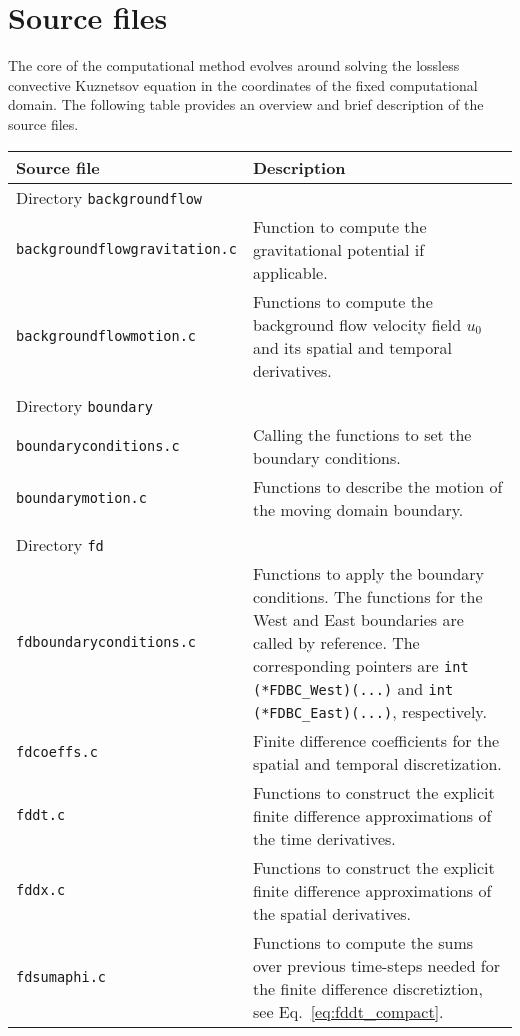\section{Source files}
\label{sec:Source files}

The core of the computational method evolves around solving the lossless convective Kuznetsov equation \citep{Schenke_et_al_2023_JASA} in the coordinates of the fixed computational domain. The following table provides an overview and brief description of the source files.

\noindent
\begin{longtable}{p{} p{}}
\textbf{Source file} & \textbf{Description}
\vspace{1mm} \\
\hline Directory {\tt backgroundflow} &\\ \hline
{\tt backgroundflowgravitation.c} & Function to compute the gravitational potential if applicable. \\
{\tt backgroundflowmotion.c} & Functions to compute the background flow velocity field $u_0$ and its spatial and temporal derivatives. \\
\\
\hline Directory {\tt boundary} &\\ \hline
{\tt boundaryconditions.c} & Calling the functions to set the boundary conditions. \\
{\tt boundarymotion.c} & Functions to describe the motion of the moving domain boundary. \\
\\
\hline Directory {\tt fd} &\\ \hline
{\tt fdboundaryconditions.c} & Functions to apply the boundary conditions. The functions for the West and East boundaries are called by reference. The corresponding pointers are {\tt int (*FDBC\_West)(...)} and {\tt int (*FDBC\_East)(...)}, respectively.  \\
{\tt fdcoeffs.c} & Finite difference coefficients for the spatial and temporal discretization. \\
{\tt fddt.c} & Functions to construct the explicit finite difference approximations of the time derivatives. \\
{\tt fddx.c} & Functions to construct the explicit finite difference approximations of the spatial derivatives.  \\
{\tt fdsumaphi.c} & Functions to compute the sums over previous time-steps needed for the finite difference discretiztion, see Eq.~\eqref{eq:fddt_compact}. \\

\end{longtable}
